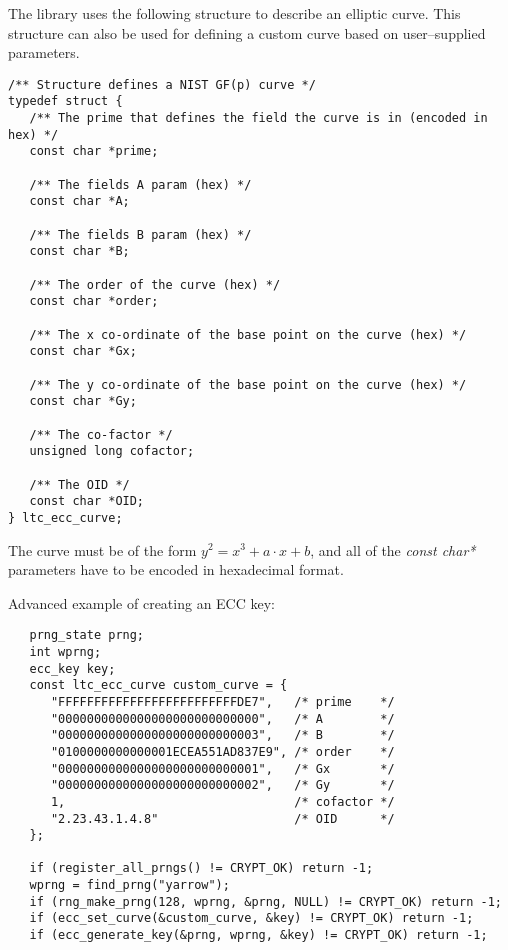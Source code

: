\documentclass[synpaper]{book}
\begin{document}
The library uses the following structure to describe an elliptic curve.
This structure can also be used for defining a custom curve based on user--supplied parameters.

\begin{verbatim}
/** Structure defines a NIST GF(p) curve */
typedef struct {
   /** The prime that defines the field the curve is in (encoded in hex) */
   const char *prime;

   /** The fields A param (hex) */
   const char *A;

   /** The fields B param (hex) */
   const char *B;

   /** The order of the curve (hex) */
   const char *order;

   /** The x co-ordinate of the base point on the curve (hex) */
   const char *Gx;

   /** The y co-ordinate of the base point on the curve (hex) */
   const char *Gy;

   /** The co-factor */
   unsigned long cofactor;

   /** The OID */
   const char *OID;
} ltc_ecc_curve;
\end{verbatim}

The curve must be of the form $y^2 = x^3 + a \cdot x + b$, and all of the \textit{const char*} parameters have to be encoded in hexadecimal format.

Advanced example of creating an ECC key:
\begin{small}
\begin{verbatim}
   prng_state prng;
   int wprng;
   ecc_key key;
   const ltc_ecc_curve custom_curve = {
      "FFFFFFFFFFFFFFFFFFFFFFFFFDE7",   /* prime    */
      "0000000000000000000000000000",   /* A        */
      "0000000000000000000000000003",   /* B        */
      "0100000000000001ECEA551AD837E9", /* order    */
      "0000000000000000000000000001",   /* Gx       */
      "0000000000000000000000000002",   /* Gy       */
      1,                                /* cofactor */
      "2.23.43.1.4.8"                   /* OID      */
   };

   if (register_all_prngs() != CRYPT_OK) return -1;
   wprng = find_prng("yarrow");
   if (rng_make_prng(128, wprng, &prng, NULL) != CRYPT_OK) return -1;
   if (ecc_set_curve(&custom_curve, &key) != CRYPT_OK) return -1;
   if (ecc_generate_key(&prng, wprng, &key) != CRYPT_OK) return -1;
\end{verbatim}
\end{small}
\end{document}
